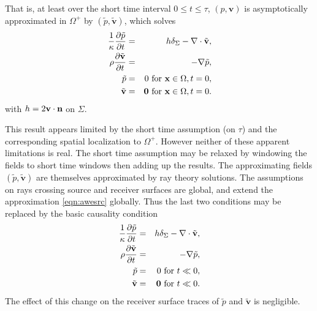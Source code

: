 \documentclass[12pt]{geophysics}
\newcommand{\bx}{\mathbf{x}}
\newcommand{\bv}{\mathbf{v}}
\begin{document}
That is, at least over the short time interval $0 \le t \le \tau$,
$(p,\bv)$ is asymptotically approximated in $\Omega^+$ by
$(\tilde{p},\tilde{\bv})$, which solves
\begin{eqnarray}
\label{eqn:awesrc}
  \frac{1}{\kappa}\frac{\partial\tilde{p}}{\partial t} & = & h \delta_{\Sigma}
                                                      - \nabla \cdot \tilde{\bv}, \nonumber \\
  \rho\frac{\partial \tilde{\bv}}{\partial t} & = & - \nabla \tilde{p}, \nonumber \\
  \tilde{p} & = & 0 \mbox{ for } \bx \in \Omega, t=0, \nonumber \\
  \tilde{\bv} & = & {\bf 0} \mbox{ for } \bx \in \Omega, t = 0.       
\end{eqnarray}
with $h = 2 \bv \cdot {\bf n}$ on $\Sigma$.

This result appears limited by the short time assumption (on $\tau$)
and the corresponding spatial localization to $\Omega^+$. However
neither of these apparent limitations is real. The short time
assumption may be relaxed by windowing the fields to short time
windows then adding up the results. The approximating fields
$(\tilde{p}, \tilde{\bv})$ are themselves approximated by ray
theory solutions. The assumptions on rays crossing source and receiver
surfaces are global, and extend the approximation \ref{eqn:awesrc}
globally. Thus the last two conditions may be replaced by the basic
causality condition
\begin{eqnarray}
  \label{eqn:awesrcmod}
  \frac{1}{\kappa}\frac{\partial\tilde{p}}{\partial t} & = & h \delta_{\Sigma}
                                                      - \nabla \cdot \tilde{\bv}, \nonumber \\
  \rho\frac{\partial \tilde{\bv}}{\partial t} & = & - \nabla \tilde{p}, \nonumber \\
  \tilde{p} & = & 0 \mbox{ for }  t \ll 0, \nonumber \\
  \tilde{\bv} & = & {\bf 0} \mbox{ for } t \ll 0.       
\end{eqnarray}
The effect of this change on the receiver surface traces of $\tilde{p}$ and
$\tilde{\bv}$ is negligible.
\end{document}

